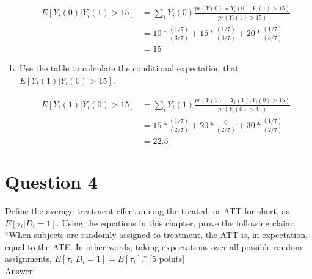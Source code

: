 \documentclass[11pt,notitlepage]{article}		%
\begin{document}
\begin{enumerate}[a)]
\begin{align*}
E[Y_i (0)| Y_i (1)>15] & =\sum_i Y_i(0) \frac{pr(Y(0)=Y_i (0),Y_i (1)>15)}{pr(Y_i (1)>15)} \\
&=10*\frac{(1/7)}{(3/7)} +15* \frac{(1/7)}{(3/7)}+20*\frac{(1/7)}{(3/7)}\\
&=15
\end{align*}

\item Use the table to calculate the conditional expectation that $E[Y_{i}(1)|Y_{i}(0) > 15]$.  

\begin{align*}
E[Y_i (1)| Y_i (0)>15] & =\sum_i Y_i(1) \frac{pr(Y(1)=Y_i (1),Y_i (0)>15)}{pr(Y_i (0)>15)} \\
&=15*\frac{(1/7)}{(2/7)} +20* \frac{0}{(2/7)}+30*\frac{(1/7)}{(2/7)}\\
&=22.5
\end{align*}


\end{enumerate}  


\section*{Question 4}
Define the average treatment effect among the treated, or ATT for short, as $E[\tau_i |D_i=1]$.  Using the equations in this chapter, prove the following claim: ``When subjects are randomly assigned to treatment, the ATT is, in expectation, equal to the ATE.  In other words, taking expectations over all possible random assignments, $E[\tau_i |D_i=1]=E[\tau_i ]$.'' [5 points] \\
Answer:\\


\end{document}
